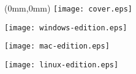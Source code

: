 
\pagestyle{empty}
\frontmatter
\begin{FRONTCOVER}
\begin{titlepage}
\begin{textblock*}{210mm}(0mm,0mm)
   \texttt{[image: cover.eps]}
\end{textblock*}
\begin{flushright}
\begin{WINDOWS}
\texttt{[image: windows-edition.eps]} 
\end{WINDOWS}
\begin{MAC}
\texttt{[image: mac-edition.eps]} 
\end{MAC}
\begin{LINUX}
\texttt{[image: linux-edition.eps]} 
\end{LINUX}
\end{flushright}
\end{titlepage}
\end{FRONTCOVER}

